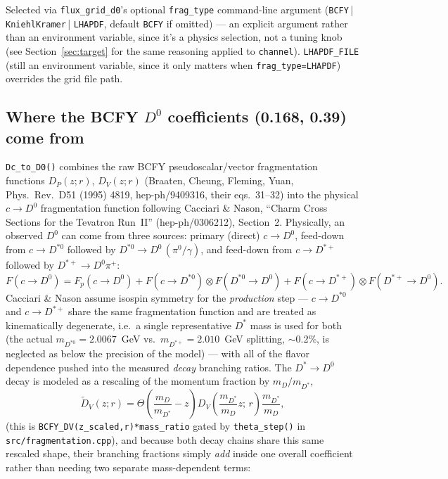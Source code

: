 \documentclass[11pt]{article}
\begin{document}
Selected via \texttt{flux\_grid\_d0}'s optional \texttt{frag\_type}
command-line argument (\texttt{BCFY}\,|\,\texttt{KniehlKramer}\,|
\texttt{LHAPDF}, default \texttt{BCFY} if omitted) — an explicit argument
rather than an environment variable, since it's a physics selection, not a
tuning knob (see Section~\ref{sec:target} for the same reasoning applied
to \texttt{channel}). \texttt{LHAPDF\_FILE} (still an environment
variable, since it only matters when \texttt{frag\_type=LHAPDF}) overrides
the grid file path.

\subsection{Where the BCFY $D^0$ coefficients (0.168, 0.39) come from}
\label{sec:bcfy-coeffs}

\texttt{Dc\_to\_D0()} combines the raw BCFY pseudoscalar/vector
fragmentation functions $D_P(z;r)$, $D_V(z;r)$ (Braaten, Cheung, Fleming,
Yuan, Phys.\ Rev.\ D51 (1995) 4819, hep-ph/9409316, their eqs.\ 31--32)
into the physical $c\to D^0$ fragmentation function following Cacciari \&
Nason, ``Charm Cross Sections for the Tevatron Run~II''
(hep-ph/0306212), Section~2. Physically, an observed $D^0$ can come from
three sources: primary (direct) $c\to D^0$, feed-down from $c\to D^{*0}$
followed by $D^{*0}\to D^0\,(\pi^0/\gamma)$, and feed-down from
$c\to D^{*+}$ followed by $D^{*+}\to D^0\pi^+$:
\[
F(c\to D^0) = F_p(c\to D^0) + F(c\to D^{*0})\otimes F(D^{*0}\to D^0)
                             + F(c\to D^{*+})\otimes F(D^{*+}\to D^0).
\]
Cacciari \& Nason assume isospin symmetry for the \emph{production} step
— $c\to D^{*0}$ and $c\to D^{*+}$ share the same fragmentation function
and are treated as kinematically degenerate, i.e.\ a single representative
$D^*$ mass is used for both (the actual $m_{D^{*0}}=2.0067$~GeV vs.\
$m_{D^{*+}}=2.010$~GeV splitting, $\sim$0.2\%, is neglected as below the
precision of the model) — with all of the flavor dependence pushed into
the measured \emph{decay} branching ratios. The $D^*\to D^0$ decay is
modeled as a rescaling of the momentum fraction by $m_D/m_{D^*}$,
\[
\tilde D_V(z;r) = \Theta\!\left(\frac{m_D}{m_{D^*}}-z\right)
                   D_V\!\left(\frac{m_{D^*}}{m_D}z;\,r\right)\frac{m_{D^*}}{m_D},
\]
(this is \texttt{BCFY\_DV(z\_scaled,r)*mass\_ratio} gated by
\texttt{theta\_step()} in \texttt{src/fragmentation.cpp}), and because
both decay chains share this same rescaled shape, their branching
fractions simply \emph{add} inside one overall coefficient rather than
needing two separate mass-dependent terms:
\end{document}
